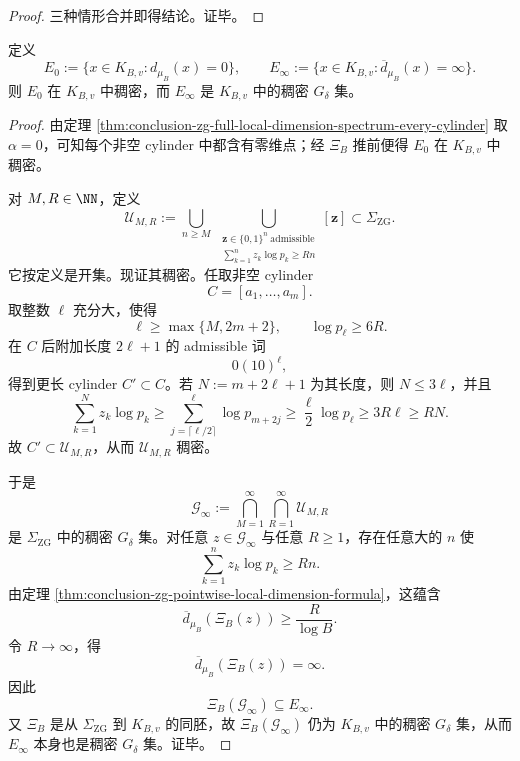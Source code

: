 \begin{proof}
三种情形合并即得结论。证毕。
\end{proof}

\begin{corollary}[零维层与无限维层的拓扑共存]\label{cor:conclusion-zg-zero-infinite-local-dimension-topological-coexistence}
定义
\[
E_0:=\{x\in K_{B,v}: d_{\mu_B}(x)=0\},
\qquad
E_\infty:=\{x\in K_{B,v}: \overline d_{\mu_B}(x)=\infty\}.
\]
则 \(E_0\) 在 \(K_{B,v}\) 中稠密，而 \(E_\infty\) 是 \(K_{B,v}\) 中的稠密 \(G_\delta\) 集。
\end{corollary}
\begin{proof}
由定理 \ref{thm:conclusion-zg-full-local-dimension-spectrum-every-cylinder} 取 \(\alpha=0\)，可知每个非空 cylinder 中都含有零维点；经 \(\Xi_B\) 推前便得 \(E_0\) 在 \(K_{B,v}\) 中稠密。

对 \(M,R\in\NN\)，定义
\[
\mathcal U_{M,R}
:=
\bigcup_{n\ge M}
\ \bigcup_{\substack{\mathbf z\in\{0,1\}^{n}\ \mathrm{admissible}\\[1mm]
\sum_{k=1}^{n}z_k\log p_k\ge Rn}}
[\mathbf z]
\subset \Sigma_{\mathrm{ZG}}.
\]
它按定义是开集。现证其稠密。任取非空 cylinder
\[
C=[a_1,\dots,a_m].
\]
取整数 \(\ell\) 充分大，使得
\[
\ell\ge \max\{M,2m+2\},
\qquad
\log p_\ell\ge 6R.
\]
在 \(C\) 后附加长度 \(2\ell+1\) 的 admissible 词
\[
0(10)^\ell,
\]
得到更长 cylinder \(C'\subset C\)。若 \(N:=m+2\ell+1\) 为其长度，则 \(N\le 3\ell\)，并且
\[
\sum_{k=1}^{N}z_k\log p_k
\ge
\sum_{j=\lceil \ell/2\rceil}^{\ell}\log p_{m+2j}
\ge
\frac{\ell}{2}\log p_\ell
\ge
3R\ell
\ge
RN.
\]
故 \(C'\subset \mathcal U_{M,R}\)，从而 \(\mathcal U_{M,R}\) 稠密。

于是
\[
\mathcal G_\infty:=\bigcap_{M=1}^{\infty}\bigcap_{R=1}^{\infty}\mathcal U_{M,R}
\]
是 \(\Sigma_{\mathrm{ZG}}\) 中的稠密 \(G_\delta\) 集。对任意 \(z\in \mathcal G_\infty\) 与任意 \(R\ge 1\)，存在任意大的 \(n\) 使
\[
\sum_{k=1}^{n}z_k\log p_k\ge Rn.
\]
由定理 \ref{thm:conclusion-zg-pointwise-local-dimension-formula}，这蕴含
\[
\overline d_{\mu_B}(\Xi_B(z))\ge \frac{R}{\log B}.
\]
令 \(R\to\infty\)，得
\[
\overline d_{\mu_B}(\Xi_B(z))=\infty.
\]
因此
\[
\Xi_B(\mathcal G_\infty)\subseteq E_\infty.
\]
又 \(\Xi_B\) 是从 \(\Sigma_{\mathrm{ZG}}\) 到 \(K_{B,v}\) 的同胚，故 \(\Xi_B(\mathcal G_\infty)\) 仍为 \(K_{B,v}\) 中的稠密 \(G_\delta\) 集，从而 \(E_\infty\) 本身也是稠密 \(G_\delta\) 集。证毕。
\end{proof}

